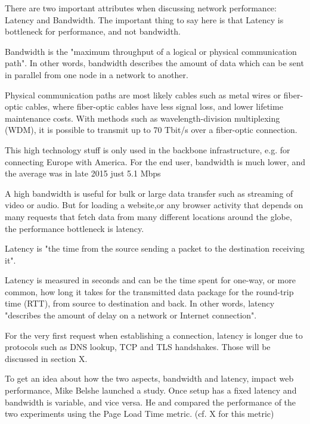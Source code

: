 There are two important attributes when discussing network performance: Latency and Bandwidth.
The important thing to say here is that Latency is bottleneck for performance, and not bandwidth.



Bandwidth is the "maximum throughput of a logical or physical communication path". %
In other words, bandwidth describes the amount of data which can be sent in parallel from one node in a network to another. 

Physical communication paths are most likely cables such as metal wires or fiber-optic cables, where fiber-optic cables have less signal loss, and lower lifetime maintenance costs.
With methods such as wavelength-division multiplexing (WDM), it is possible to transmit up to 70 Tbit/s over a fiber-optic connection.  %

This high technology stuff is only used in the backbone infrastructure, e.g. for connecting Europe with America.
For the end user, bandwidth is much lower, and the average was in late 2015 just 5.1 Mbps %

A high bandwidth is useful for bulk or large data transfer such as streaming of video or audio.
But for loading a website,or any browser activity that depends on many requests that fetch data from many different locations around the globe, the performance bottleneck is latency. %



Latency is "the time from the source sending a packet to the destination receiving it".  %

Latency is measured in seconds and can be the time spent for one-way, or more common, how long it takes for the transmitted data package for the round-trip time (RTT), from source to destination and back.
In other words, latency "describes the amount of delay on a network or Internet connection". %

For the very first request when establishing a connection, latency is longer due to protocols such as DNS lookup, TCP and TLS handshakes.
Those will be discussed in section X. %



To get an idea about how the two aspects, bandwidth and latency, impact web performance,  Mike Belshe launched a study. %
Once setup has a fixed latency and bandwidth is variable, and vice versa.
He and compared the performance of the two experiments using the Page Load Time metric. (cf. X for this metric)


